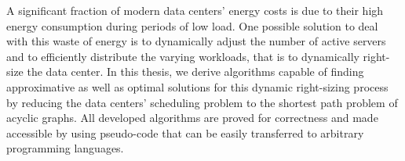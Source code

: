 \thispagestyle{empty}
\vspace*{20mm}

\begin{center}
\textbf{{\abstractname}}
\end{center}

\vspace{10mm}
A significant fraction of modern data centers' energy costs is due to their high energy consumption during periods of low load. One possible solution to deal with this waste of energy is to dynamically adjust the number of active servers and to efficiently distribute the varying workloads, that is to dynamically right-size the data center. In this thesis, we derive algorithms capable of finding approximative as well as optimal solutions for this dynamic right-sizing process by reducing the data centers' scheduling problem to the shortest path problem of acyclic graphs. All developed algorithms are proved for correctness and made accessible by using pseudo-code that can be easily transferred to arbitrary programming languages.

\cleardoublepage{}
